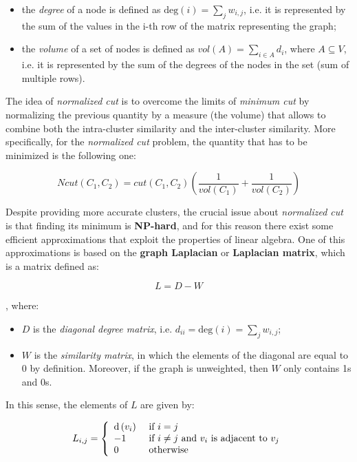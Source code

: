 \begin{itemize}
    \item the \textit{degree} of a node is defined as $\text{deg}(i) = \sum_j w_{i,j}$, i.e. it is represented by the sum of the values in the i-th row of the matrix representing the graph;
    \item the \textit{volume} of a set of nodes is defined as $vol(A) = \sum_{i \in A} d_i$, where $A \subseteq V$, i.e. it is represented by the sum of the degrees of the nodes in the set (sum of multiple rows).
\end{itemize}

The idea of \textit{normalized cut} is to overcome the limits of \textit{minimum cut} by normalizing the previous quantity by a measure (the volume) that allows to combine both the intra-cluster similarity and the inter-cluster similarity. More specifically, for the \textit{normalized cut} problem, the quantity that has to be minimized is the following one:

$$
Ncut(C_1,C_2) = cut(C_1, C_2) \left( \frac{1}{vol(C_1)} + \frac{1}{vol(C_2)} \right)
$$

Despite providing more accurate clusters, the crucial issue about \textit{normalized cut} is that finding its minimum is \textbf{NP-hard}, and for this reason there exist some efficient approximations that exploit the properties of linear algebra. One of this approximations is based on the \textbf{graph Laplacian} or \textbf{Laplacian matrix}, which is a matrix defined as:

$$
L = D - W
$$

, where:

\begin{itemize}
    \item $D$ is the \textit{diagonal degree matrix}, i.e. $d_{ii} = \text{deg}(i) = \sum_j w_{i,j}$;
    \item $W$ is the \textit{similarity matrix}, in which the elements of the diagonal are equal to 0 by definition. Moreover, if the graph is unweighted, then $W$ only contains 1s and 0s. 
\end{itemize}

In this sense, the elements of $L$ are given by:

$$
L _ { i , j } = \left\{ \begin{array} { l l } { \operatorname { d } \left( v _ { i } \right) } & { \text { if } i = j } \\ 
{ - 1 } & { \text { if } i \neq j \text { and } v _ { i } \text { is adjacent to } v _ { j } } \\ 
{ 0 } & { \text { otherwise } } \end{array} \right.
$$


